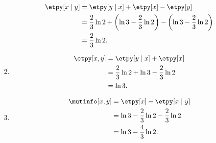 \begin{answer}{}
\begin{enumerate}[label = {\bfseries (\alph*)}]
		\begin{align}
			\etpy[x \mid y] &= \etpy[y \mid x] + \etpy[x] - \etpy[y]\\
			&= \frac{2}{3}\ln 2 + \left( \ln 3 - \frac{2}{3}\ln2 \right) - \left(\ln 3 - \frac{2}{3}\ln2\right)\\
			&= \frac{2}{3}\ln 2.
		\end{align}
		\item 
		\begin{align}
			\etpy[x, y] &= \etpy[y \mid x] + \etpy[x]\\
			&= \frac{2}{3}\ln 2 + \ln 3 - \frac{2}{3}\ln2\\
			&= \ln 3.
		\end{align}
		\item 
		\begin{align}
			\mutinfo[x, y] &= \etpy[x] - \etpy[x \mid y] \\
			&= \ln 3 - \frac{2}{3}\ln2 - \frac{2}{3}\ln 2\\
			&= \ln 3 - \frac{4}{3}\ln2.
		\end{align}
	\end{enumerate}
\end{answer}